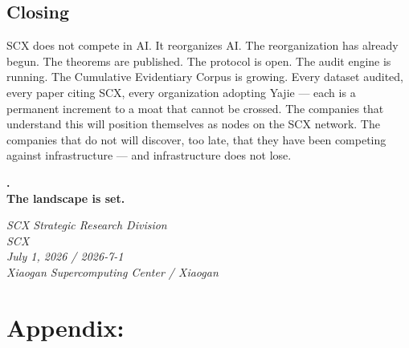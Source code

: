 \documentclass[12pt,a4paper]{article}
\theoremstyle{remark}
\begin{document}
{\subsection{Closing}
SCX does not compete in AI. It reorganizes AI.
The reorganization has already begun. The theorems are published. The protocol 
is open. The audit engine is running. The Cumulative Evidentiary Corpus is 
growing. Every dataset audited, every paper citing SCX, every organization 
adopting Yajie --- each is a permanent increment to a moat that cannot be crossed.
The companies that understand this will position themselves as nodes on the SCX 
network. The companies that do not will discover, too late, that they have been 
competing against infrastructure --- and infrastructure does not lose.
\vspace{1cm}
\begin{center}
\large\textbf{.\\The landscape is set.}
\end{center}
\vspace{0.5cm}
\begin{center}
\footnotesize
\textit{SCX Strategic Research Division}\\
\textit{SCX }\\
\textit{July 1, 2026 / 2026-7-1}\\
\textit{Xiaogan Supercomputing Center / Xiaogan}
\end{center}
\newpage
\appendix
\section{Appendix:}
}
\end{document}
